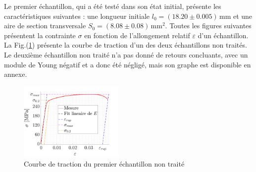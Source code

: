 \documentclass[a4paper, 12pt,oneside]{article}
\begin{document}
Le premier échantillon, qui a été testé dans son état initial, présente les caractéristiques suivantes : une longueur initiale $l_0 = (18.20 \pm 0.005)$\,mm et une aire de section transversale $S_0 = (8.08 \pm 0.08)$\,mm$^2$. Toutes les figures suivantes présentent la contrainte $\sigma$ en fonction de l'allongement relatif $\varepsilon$ d'un échantillon. La Fig.(\ref{fig4}) présente la courbe de traction d'un des deux échantillons non traités. Le deuxième échantillon non traité n'a pas donné de retours concluants, avec un module de Young négatif et a donc été négligé, mais son graphe est disponible en annexe.
\vspace{-0.8cm}
\begin{figure}[H]
    \centering
    \includegraphics[width=0.45\textwidth]{GRAPHES/Graphe_1.jpg}
    \captionsetup{justification=centering}
    \caption{Courbe de traction du premier échantillon non traité}
    \label{fig4}
\end{figure}
\vspace{-1cm}
\end{document}
